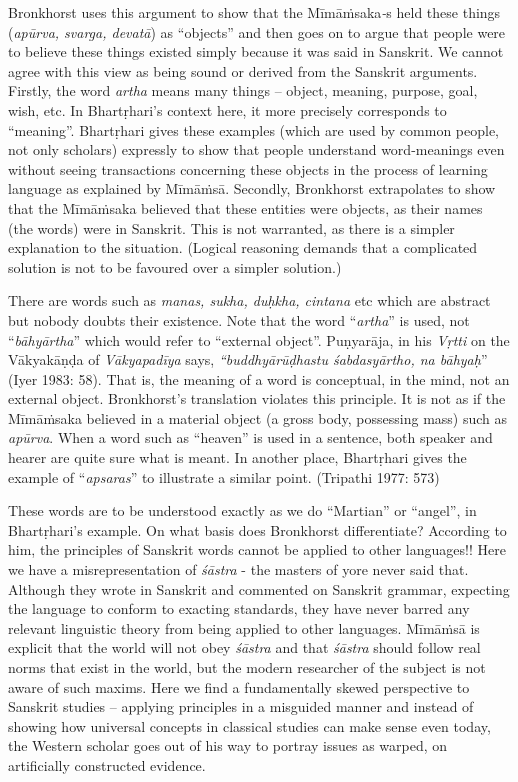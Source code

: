 Bronkhorst uses this argument to show that the Mīmāṁsaka\textit{-}s held these things (\textit{apūrva, svarga, devatā}) as “objects” and then goes on to argue that people were to believe these things existed simply because it was said in Sanskrit. We cannot agree with this view as being sound or derived from the Sanskrit arguments. Firstly, the word \textit{artha} means many things -- object, meaning, purpose, goal, wish, etc. In Bhartṛhari’s context here, it more precisely corresponds to “meaning”. Bhartṛhari gives these examples (which are used by common people, not only scholars) expressly to show that people understand word-meanings even without seeing transactions concerning these objects in the process of learning language as explained by Mīmāṁsā. Secondly, Bronkhorst extrapolates to show that the Mīmāṁsaka believed that these entities were objects, as their names (the words) were in Sanskrit. This is not warranted, as there is a simpler explanation to the situation. (Logical reasoning demands that a complicated solution is not to be favoured over a simpler solution.)

There are words such as \textit{manas, sukha, duḥkha, cintana} etc which are abstract but nobody doubts their existence. Note that the word “\textit{artha}” is used, not “\textit{bāhyārtha}” which would refer to “external object”. Puṇyarāja, in his \textit{Vṛtti} on the {Vākyakāṇḍa} of \textit{Vākyapadīya} says, \textit{“buddhyārūḍhastu śabdasyārtho, na bāhyaḥ}” (Iyer 1983: 58). That is, the meaning of a word is conceptual, in the mind, not an external object. Bronkhorst’s translation violates this principle. It is not as if the Mīmāṁsaka believed in a material object (a gross body, possessing mass) such as \textit{apūrva}. When a word such as “heaven” is used in a sentence, both speaker and hearer are quite sure what is meant. In another place, Bhartṛhari gives the example of “\textit{apsaras}” to illustrate a similar point. (Tripathi 1977: 573)

These words are to be understood exactly as we do “Martian” or “angel”, in Bhartṛhari’s example. On what basis does Bronkhorst differentiate? According to him, the principles of Sanskrit words cannot be applied to other languages!! Here we have a misrepresentation of \textit{śāstra} - the masters of yore never said that. Although they wrote in Sanskrit and commented on Sanskrit grammar, expecting the language to conform to exacting standards, they have never barred any relevant linguistic theory from being applied to other languages. Mīmāṁsā is explicit that the world will not obey \textit{śāstra} and that \textit{śāstra} should follow real norms that exist in the world, but the modern researcher of the subject is not aware of such maxims. Here we find a fundamentally skewed perspective to Sanskrit studies – applying principles in a misguided manner and instead of showing how universal concepts in classical studies can make sense even today, the Western scholar goes out of his way to portray issues as warped, on artificially constructed evidence.

